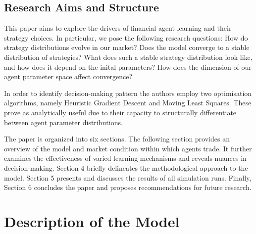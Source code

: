 \documentclass[11pt]{article}
\begin{document}
\subsection{Research Aims and Structure}
This paper aims to explore the drivers of financial agent learning and their strategy choices. In particular, we pose the following research questions: How do strategy distributions evolve in our market? Does the model converge to a stable distribution of strategies? What does such a stable strategy distribution look like, and how does it depend on the inital parameters? How does the dimension of our agent parameter space affect convergence?

In order to identify decision-making pattern the authors employ two optimisation algorithms, namely Heuristic Gradient Descent and Moving Least Squares. These prove as analytically useful due to their capacity to structurally differentiate between agent parameter distributions. 

The paper is organized into six sections. The following section provides an overview of the model and market condition within which agents trade. It further examines the effectiveness of varied learning mechanisms and reveals nuances in decision-making. Section 4 briefly delineates the methodological approach to the model. Section 5 presents and discusses the results of all simulation runs. Finally, Section 6 concludes the paper and proposes recommendations for future research.

\section{Description of the Model}
\end{document}

